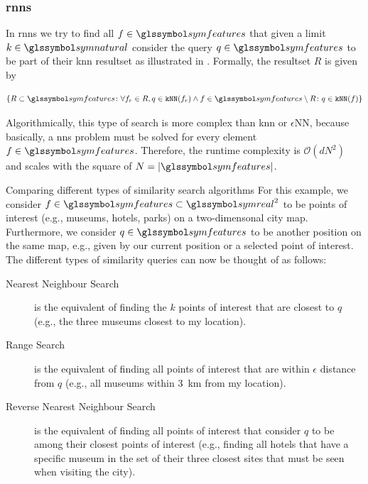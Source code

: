 \subsubsection{\texorpdfstring{\acrfull{rnns}}{Reverse Nearest Neighbour Search (RNNS)}}

In \acrshort{rnns} we try to find all $f \in \symfeatures$ that given a limit $k \in \symnatural$ consider the query $q \in \symfeatures$ to be part of their \acrshort{knn} resultset as illustrated in . Formally, the resultset $R$ is given by  

\begin{equation}
    \label{eq:rknn}
    \lbrace R \subset \symfeatures \colon \forall f_r \in R, q \in \texttt{kNN}(f_r) \wedge f \in \symfeatures \setminus R \colon q \in \texttt{kNN}(f)  \rbrace
\end{equation}

Algorithmically, this type of search is more complex than \acrshort{knn} or $\epsilon$NN, because basically, a \acrshort{nns} problem must be solved for every element $f \in \symfeatures$. Therefore, the runtime complexity is $\mathcal{O}(dN^2)$ and scales with the square of $N = |\symfeatures|$. 

\begin{example}[label=example:similarity_search]{Comparing different types of similarity search algorithms}{}
    For this example, we consider $f \in \symfeatures \subset \symreal^2$ to be points of interest (e.g., museums, hotels, parks) on a two-dimensonal city map. Furthermore, we consider $q \in \symfeatures$ to be another position on the same map, e.g., given by our current position or a selected point of interest. The different types of similarity queries can now be thought of as follows:

    \begin{description}
        \item[Nearest Neighbour Search] is the equivalent of finding the $k$ points of interest that are closest to $q$ (e.g., the three museums closest to my location).
        \item[Range Search] is the equivalent of finding all points of interest that are within $\epsilon$ distance from  $q$ (e.g., all museums within \SI{3}{km} from my location).
        \item[Reverse Nearest Neighbour Search] is the equivalent of finding all points of interest that consider $q$ to be among their closest points of interest (e.g., finding all hotels that have a specific museum in the set of their three closest sites that must be seen when visiting the city).
    \end{description}
\end{example}

